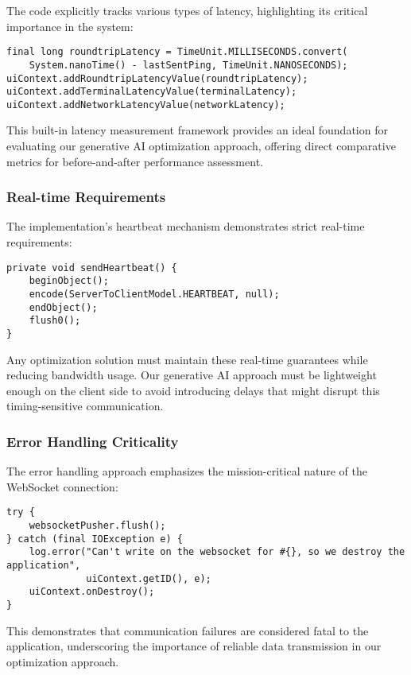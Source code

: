 \documentclass[a4paper, 11pt, twoside, openright]{report}
\begin{document}
The code explicitly tracks various types of latency, highlighting its critical importance in the system:

\begin{verbatim}
final long roundtripLatency = TimeUnit.MILLISECONDS.convert(
    System.nanoTime() - lastSentPing, TimeUnit.NANOSECONDS);
uiContext.addRoundtripLatencyValue(roundtripLatency);
uiContext.addTerminalLatencyValue(terminalLatency);
uiContext.addNetworkLatencyValue(networkLatency);
\end{verbatim}

This built-in latency measurement framework provides an ideal foundation for evaluating our generative AI optimization approach, offering direct comparative metrics for before-and-after performance assessment.

\subsubsection{Real-time Requirements}

The implementation's heartbeat mechanism demonstrates strict real-time requirements:

\begin{verbatim}
private void sendHeartbeat() {
    beginObject();
    encode(ServerToClientModel.HEARTBEAT, null);
    endObject();
    flush0();
}
\end{verbatim}

Any optimization solution must maintain these real-time guarantees while reducing bandwidth usage. Our generative AI approach must be lightweight enough on the client side to avoid introducing delays that might disrupt this timing-sensitive communication.

\subsubsection{Error Handling Criticality}

The error handling approach emphasizes the mission-critical nature of the WebSocket connection:

\begin{verbatim}
try {
    websocketPusher.flush();
} catch (final IOException e) {
    log.error("Can't write on the websocket for #{}, so we destroy the application", 
              uiContext.getID(), e);
    uiContext.onDestroy();
}
\end{verbatim}

This demonstrates that communication failures are considered fatal to the application, underscoring the importance of reliable data transmission in our optimization approach.
\end{document}
